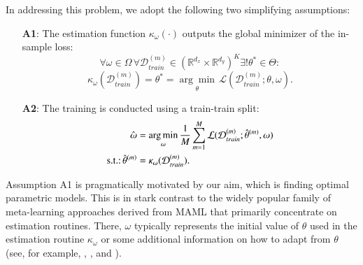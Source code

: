 \documentclass[3p,times,twocolumn]{elsarticle}
\begin{document}
In addressing this problem, we adopt the following two simplifying assumptions:
\begin{itemize}[itemindent=2em]
    \item[\textbf{A1}:] The estimation function $\kappa_{\omega}(\cdot)$ outputs the global minimizer of the in-sample loss:
        \begin{equation}
            \forall \omega \in \Omega \,\forall  \mathcal{D}_{train}^{(m)} \in \left(\mathbb{R}^{d_{x}} \times \mathbb{R}^{d_{y}}\right)^{K} \exists! \theta^{*}\in \Theta:
        \end{equation}
        \begin{equation}
            \kappa_{\omega} (\mathcal{D}_{train}^{(m)})=\theta^{*} = \underset{\theta}{\arg\min} \, \mathcal{L}(\mathcal{D}_{train}^{(m)};\theta, \omega).
        \end{equation}
    \item[\textbf{A2}:] The training is conducted using a train-train split:
        \begin{equation}
            \begin{split}
                \hat{\omega} &=  \underset{\omega}{\arg\min} \, \dfrac{1}{M} \sum_{m=1}^{M}  \mathcal{L}(\mathcal{D}_{train}^{(m)}; \hat{\theta}^{(m)}, \omega)  \\
                \textnormal{s.t.:} \,\hat{\theta}^{(m)} &= \kappa_{\omega} (\mathcal{D}_{train}^{(m)}).
            \end{split}
        \end{equation}
\end{itemize}

Assumption A1 is pragmatically motivated by our aim, which is finding optimal parametric models.
This is in stark contrast to the widely popular family of meta-learning approaches derived from MAML \citep{finnModelAgnosticMetaLearningFast2017} that primarily concentrate on estimation routines.
There, $\omega$ typically represents the initial value of $\theta$ used in the estimation routine $\kappa_{\omega}$ or some additional information on how to adapt from $\theta$ (see, for example, \citet{finnModelAgnosticMetaLearningFast2017}, \citet{liMetaSGDLearningLearn2017}, and \citet{parkMetacurvature2019}).
\end{document}
